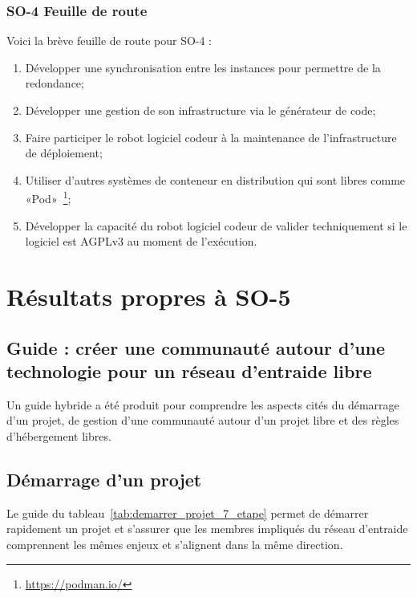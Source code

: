 \subsubsection{SO-4 Feuille de route}
Voici la brève feuille de route pour SO-4 :
\begin{enumerate}
    \item Développer une synchronisation entre les instances pour permettre de la redondance;
    \item Développer une gestion de son infrastructure via le générateur de code;
    \item Faire participer le robot logiciel codeur à la maintenance de l’infrastructure de déploiement;
    \item Utiliser d’autres systèmes de conteneur en distribution qui sont libres comme «Pod»~\footnote{\url{https://podman.io/}};
    \item Développer la capacité du robot logiciel codeur de valider techniquement si le logiciel est AGPLv3 au moment de l’exécution.
\end{enumerate}

\section{Résultats propres à SO-5}

\subsection{Guide : créer une communauté autour d’une technologie pour un réseau d’entraide libre}

Un guide hybride a été produit pour comprendre les aspects cités du démarrage d’un projet, de gestion d’une communauté autour d’un projet libre et des règles d'hébergement libres.

\subsection{Démarrage d’un projet}

Le guide du tableau~\ref{tab:demarrer_projet_7_etape} permet de démarrer rapidement un projet et s'assurer que les membres impliqués du réseau d'entraide comprennent les mêmes enjeux et s'alignent dans la même direction.


